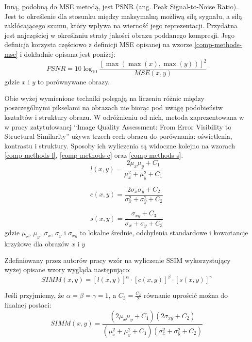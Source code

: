     Inną, podobną do MSE metodą, jest PSNR (ang. Peak Signal-to-Noise Ratio). Jest to określenie dla stosunku między maksymalną możliwą siłą sygnału, a siłą zakłócającego szumu, który wpływa na wierność jego reprezentacji. Przydatna jest najczęściej w określaniu straty jakości obrazu poddanego kompresji. Jego definicja korzysta częściowo z definicji MSE opisanej na wzorze \ref{comp-methods-mse} i dokładnie opisana jest poniżej: 
    \begin{equation} \label{comp-methods-psnr}
       PSNR=10\log_{10} \frac{[\max(\max(x),\max(y))]^2}{MSE(x,y)}
    \end{equation}
    gdzie \(x\) i \(y\) to porównywane obrazy.
    
    Obie wyżej wymienione techniki polegają na liczeniu różnic między poszczególnymi pikselami na obrazach nie biorąc pod uwagę podobieństw kształtów i struktury obrazu. W odróżnieniu od nich, metoda zaprezentowana w
    w pracy zatytułowanej ``Image Quality Assessment: From Error Visibility to Structural Similarity'' używa trzech cech obrazu do porównania: oświetlenia, kontrastu i struktury. Sposoby ich wyliczenia są widoczne kolejno na wzorach \ref{comp-methods-l}, \ref{comp-methods-c} oraz \ref{comp-methods-s}. 
    \begin{equation} \label{comp-methods-l}
       l(x,y)=\frac{2\mu_x	\mu_y + C_1}{\mu_x^2 + \mu_y^2 + C_1}
    \end{equation}
    
    \begin{equation} \label{comp-methods-c}
       c(x,y)=\frac{2\sigma_x	\sigma_y + C_2}{\sigma_x^2 + \sigma_y^2 + C_2}
    \end{equation}
    
    \begin{equation} \label{comp-methods-s}
       s(x,y)=\frac{\sigma_{xy} + C_3}{\sigma_x + \sigma_y + C_3}
    \end{equation}
    gdzie \(\mu_x\), \(\mu_y\), \(\sigma_x\), \(\sigma_y\) i \(\sigma_{xy}\) to lokalne średnie, odchylenia standardowe i kowariancje krzyżowe dla obrazów \(x\) i \(y\) 
    
    Zdefiniowany przez autorów pracy wzór na wyliczenie SSIM wykorzystujący wyżej opisane wzory wygląda następująco:
    \begin{equation} \label{comp-methods-ssim-assumed}
       SIMM(x,y)=[l(x,y)]^{\alpha} \cdot [c(x,y)]^{\beta} \cdot [s(x,y)]^{\gamma}
    \end{equation}
    
    Jeśli przyjmiemy, że \(\alpha = \beta = \gamma = 1\), a \(C_3 = \frac{C_2}{2}\) równanie uprościć można do finalnej postaci:
    \begin{equation} \label{comp-methods-ssim}
       SIMM(x,y)=\frac{(2\mu_x\mu_y + C_1)(2\sigma_{xy} + C_2)}{(\mu_x^2 + \mu_y^2 + C_1)(\sigma_x^2 + \sigma_y^2 + C_2)}
    \end{equation}
    
